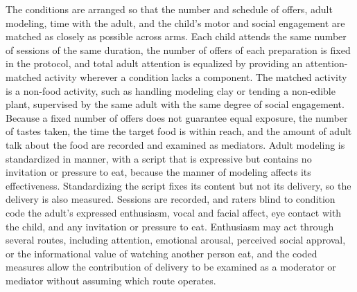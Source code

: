 \documentclass[11pt]{article}
\theoremstyle{remark}
\begin{document}
The conditions are arranged so that the number and schedule of offers, adult modeling, time with the adult, and the child's motor and social engagement are matched as closely as possible across arms. Each child attends the same number of sessions of the same duration, the number of offers of each preparation is fixed in the protocol, and total adult attention is equalized by providing an attention-matched activity wherever a condition lacks a component. The matched activity is a non-food activity, such as handling modeling clay or tending a non-edible plant, supervised by the same adult with the same degree of social engagement. Because a fixed number of offers does not guarantee equal exposure, the number of tastes taken, the time the target food is within reach, and the amount of adult talk about the food are recorded and examined as mediators. Adult modeling is standardized in manner, with a script that is expressive but contains no invitation or pressure to eat, because the manner of modeling affects its effectiveness. Standardizing the script fixes its content but not its delivery, so the delivery is also measured. Sessions are recorded, and raters blind to condition code the adult's expressed enthusiasm, vocal and facial affect, eye contact with the child, and any invitation or pressure to eat. Enthusiasm may act through several routes, including attention, emotional arousal, perceived social approval, or the informational value of watching another person eat, and the coded measures allow the contribution of delivery to be examined as a moderator or mediator without assuming which route operates.
\end{document}
